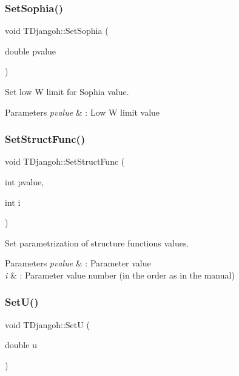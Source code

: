 \subsubsection{\texorpdfstring{Set\+Sophia()}{SetSophia()}}
{\footnotesize\ttfamily void T\+Djangoh\+::\+Set\+Sophia (\begin{DoxyParamCaption}\item[{double}]{pvalue }\end{DoxyParamCaption})}



Set low W limit for Sophia value. 


\begin{DoxyParams}{Parameters}
{\em pvalue} & \+: Low W limit value \\
\hline
\end{DoxyParams}
\mbox{\label{class_t_djangoh_aa8331885aeb7880a63ebdfcf32919f9b}} 
\subsubsection{\texorpdfstring{Set\+Struct\+Func()}{SetStructFunc()}}
{\footnotesize\ttfamily void T\+Djangoh\+::\+Set\+Struct\+Func (\begin{DoxyParamCaption}\item[{int}]{pvalue,  }\item[{int}]{i }\end{DoxyParamCaption})}



Set parametrization of structure functions values. 


\begin{DoxyParams}{Parameters}
{\em pvalue} & \+: Parameter value \\
\hline
{\em i} & \+: Parameter value number (in the order as in the manual) \\
\hline
\end{DoxyParams}
\mbox{\label{class_t_djangoh_a69cebdc5dc26bfd0def872a996da0650}} 
\subsubsection{\texorpdfstring{Set\+U()}{SetU()}}
{\footnotesize\ttfamily void T\+Djangoh\+::\+SetU (\begin{DoxyParamCaption}\item[{double}]{u }\end{DoxyParamCaption})\hspace{0.3cm}{\ttfamily [inline]}}

